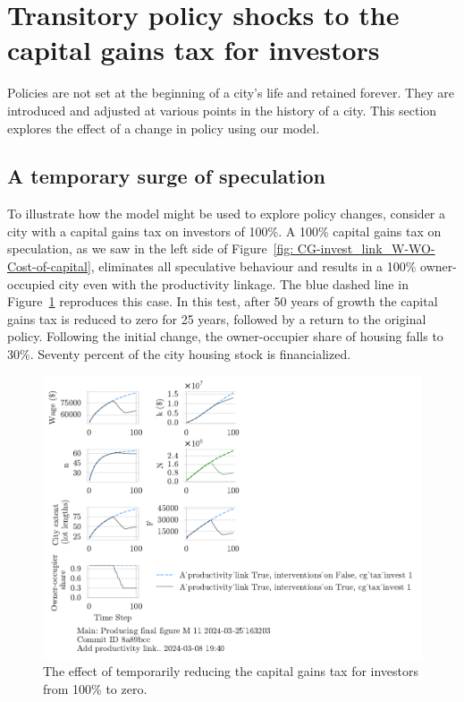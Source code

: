 \section{Transitory policy shocks to the capital gains tax for investors}
Policies are not set at the beginning of a city's life and retained forever. %
They are introduced and adjusted at various points in the history of a city. This section explores the effect of a change in policy using our model.

\subsection{A temporary surge of speculation}
To illustrate how the model might be used to explore policy changes, consider a city with a capital gains tax on investors of 100\%. A 100\% capital gains tax on speculation, as we saw in the left side of Figure~\ref{fig: CG-invest_link_W-WO-Cost-of-capital}, eliminates all speculative behaviour and results in a 100\% owner-occupied city even with the productivity linkage. The blue dashed line in Figure~\ref{fig:cgtax_setback} reproduces this case. In this test, after 50 years of growth the capital gains tax is reduced to zero for 25 years, followed by a return to the original policy. Following the initial change,  the owner-occupier share of housing falls to 30\%. Seventy percent of the city housing stock is financialized.

\begin{figure}[h!tb] 
    \centering
    \includegraphics[scale=1., trim={0 1.4cm 7cm 0},clip]{fig/interventions_on-cg_tax_invest-163203.pdf}  %
    \caption[Temporarily reducing the capital gains tax for investors from 100\%]{The effect of temporarily reducing the capital gains tax for investors from 100\% to zero.}
    \label{fig:cgtax_setback}
\end{figure}


